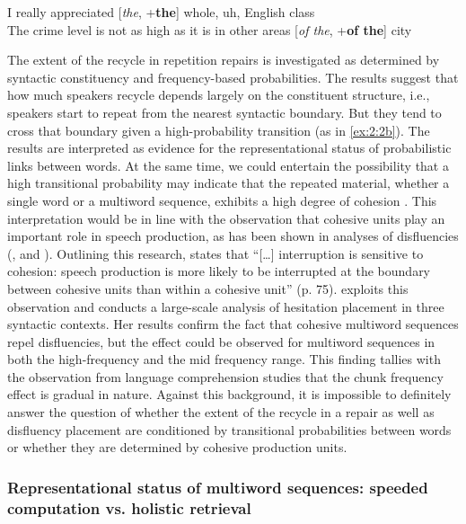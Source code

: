 \ea
    \ea
	\label{ex:2:2a}
	I really appreciated [\textit{the}, +\textbf{the}] whole, uh, English class\\

    \ex
	\label{ex:2:2b}
	The crime level is not as high as it is in other areas [\textit{of the}, +\textbf{of the}] city
	\hfill\hbox{\citep[][481]{kapatsinski2005}}
	\z
\z

\noindent The extent of the recycle in repetition repairs is investigated as determined by syntactic constituency and frequency-based probabilities. The results suggest that how much speakers recycle depends largely on the constituent structure, i.e., speakers start to repeat from the nearest syntactic boundary. But they tend to cross that boundary given a high-probability transition (as in \ref{ex:2:2b}). The results are interpreted as evidence for the representational status of probabilistic links between words. At the same time, we could entertain the possibility that a high transitional probability may indicate that the repeated material, whether a single word or a multiword sequence, exhibits a high degree of cohesion \citep[for the effect of frequency on interruptibility of words, see][]{kapatsinski2010}. This interpretation would be in line with the observation that cohesive units play an important role in speech production, as has been shown in analyses of disfluencies (\citealt[for reviews, see][74--75]{kapatsinski2010}, and \citealt[][]{schneider2014}). Outlining this research, \citet{kapatsinski2010} states that ``[\dots] interruption is sensitive to cohesion: speech production is more likely to be interrupted at the boundary between cohesive units than within a cohesive unit'' (p. 75). \citet{schneider2014} exploits this observation and conducts a large-scale analysis of hesitation placement in three syntactic contexts. Her results confirm the fact that cohesive multiword sequences repel disfluencies, but the effect could be observed for multiword sequences in both the high-frequency and the mid frequency range. This finding tallies with the observation from language comprehension studies \citep[cf.][]{reali-christiansen,arnon-snider} that the chunk frequency effect is gradual in nature. Against this background, it is impossible to definitely answer the question of whether the extent of the recycle in a repair as well as disfluency placement are conditioned by transitional probabilities between words or whether they are determined by cohesive production units.

\subsubsection{Representational status of multiword sequences: speeded computation vs. holistic retrieval}

